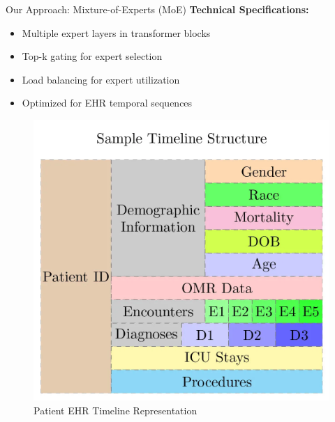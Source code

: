 \documentclass[final]{beamer}
\newlength{\colwidth}
\begin{document}
\begin{frame}[t]
\begin{columns}[t]
\begin{column}{\colwidth}
\begin{block}{Our Approach: Mixture-of-Experts (MoE)}
           \textbf{Technical Specifications:}
           \begin{itemize}
               \item Multiple expert layers in transformer blocks
               \item Top-k gating for expert selection
               \item Load balancing for expert utilization
               \item Optimized for EHR temporal sequences
           \end{itemize}

      \begin{figure}
        \centering
        \includegraphics[width=0.4\linewidth]{figures/ehr_timeline.png}
        \caption{Patient EHR Timeline Representation}
        \label{fig:ehr_timeline}
    \end{figure}



      \end{block}

\end{column}





    



\end{columns}
\end{frame}
\end{document}
